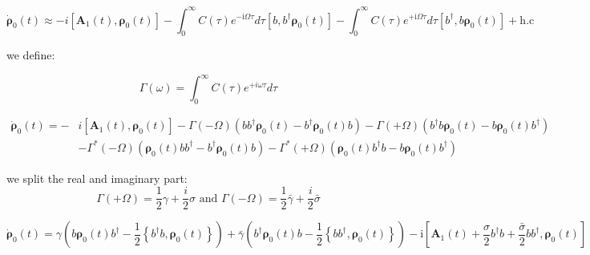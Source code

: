 \documentclass[%
preprint,
onecolumn,
notitlepag,
 amsmath,amssymb,
 aps,
 pra,
]{revtex4-2}
\begin{document}
 \begin{equation} 
 \dot{\boldsymbol{\rho}}_0(t) \approx -i \left[ \boldsymbol{A}_1(t) , \boldsymbol{\rho}_0(t) \right]  -\int_{0}^{\infty} C(\tau) e^{-\mathrm{i} \Omega \tau} d \tau\left[b, b^{\dagger} \boldsymbol{\rho}_{\mathrm{0}}(t) \right]-\int_{0}^{\infty} C(\tau) e^{+\mathrm{i} \Omega \tau} d \tau\left[b^{\dagger}, b \boldsymbol{\rho}_{\mathrm{0}}(t) \right]+\mathrm{h} . \mathrm{c}\end{equation}
 
 we define:
 
 \begin{equation}\Gamma(\omega)=\int_{0}^{\infty} C(\tau) e^{+i \omega \tau} d \tau\end{equation}
 
 \begin{equation}\begin{aligned}
\dot{\boldsymbol{\rho}}_0(t) =-& i \left[ \boldsymbol{A}_1(t) , \boldsymbol{\rho}_0(t) \right] -\Gamma(-\Omega)\left(b b^{\dagger} \boldsymbol{\rho}_{\mathrm{0}}(t)-b^{\dagger} \boldsymbol{\rho}_{\mathrm{0}}(t) b\right)-\Gamma(+\Omega)\left(b^{\dagger} b \boldsymbol{\rho}_{\mathrm{0}}(t)-b \boldsymbol{\rho}_{\mathrm{0}}(t) b^{\dagger}\right) \\
&-\Gamma^{*}(-\Omega)\left(\boldsymbol{\rho}_{\mathrm{0}}(t) b b^{\dagger}-b^{\dagger} \boldsymbol{\rho}_{\mathrm{0}}(t) b\right)-\Gamma^{*}(+\Omega)\left(\boldsymbol{\rho}_{\mathrm{0}}(t) b^{\dagger} b-b \boldsymbol{\rho}_{\mathrm{0}}(t) b^{\dagger}\right)
\end{aligned}\end{equation}

we split the real and imaginary part:
\begin{equation}
\Gamma(+\Omega)=\frac{1}{2} \gamma+\frac{i}{2} \sigma \text { and } \Gamma(-\Omega)=\frac{1}{2} \bar{\gamma}+\frac{i}{2} \bar{\sigma}\end{equation}

\begin{equation}
\dot{\boldsymbol{\rho}}_0(t) = \gamma\left(b \boldsymbol{\rho}_{\mathrm{0}}(t) b^{\dagger}-\frac{1}{2}\left\{b^{\dagger} b, \boldsymbol{\rho}_{\mathrm{0}}(t)\right\}\right)+\bar{\gamma}\left(b^{\dagger}\boldsymbol{\rho}_{\mathrm{0}}(t) b-\frac{1}{2}\left\{b b^{\dagger}, \boldsymbol{\rho}_{\mathrm{0}}(t) \right\}\right)-\mathrm{i}\left[\boldsymbol{A}_1(t) + \frac{\sigma}{2} b^{\dagger} b+\frac{\bar{\sigma}}{2} b b^{\dagger}, \boldsymbol{\rho}_{\mathrm{0}}(t) \right]\end{equation}
\end{document}
